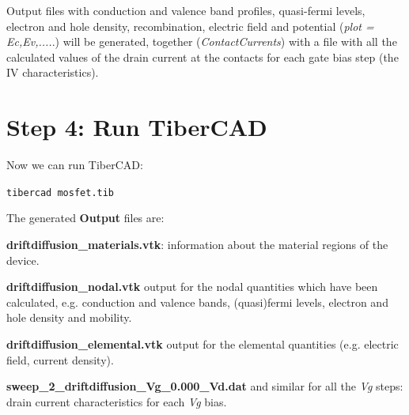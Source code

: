 Output files with conduction and valence band profiles, quasi-fermi levels, electron and hole  density, recombination, electric field and potential (\textit{plot = Ec,Ev,....}.) will be  generated, together (\textit{ContactCurrents}) with  a file with  all the calculated values of the drain current at the contacts for each  gate bias  step  (the IV characteristics).

\section*{Step 4: Run TiberCAD{}}

Now we can run TiberCAD{}:

\texttt{tibercad  mosfet.tib}


\vspace{0.5cm}
The generated \textbf{Output} files are:

\textbf{driftdiffusion\_materials.vtk}:  information about the material regions of the device.

\textbf{driftdiffusion\_nodal.vtk}   output for the nodal quantities which have been calculated, e.g. conduction and valence bands, (quasi)fermi levels, electron and hole density and mobility.

\textbf{driftdiffusion\_elemental.vtk}  output for the elemental  quantities (e.g. electric field, current density).


\textbf{sweep\_2\_driftdiffusion\_Vg\_0.000\_Vd.dat}  and  similar for  all the  \textit{Vg}  steps: drain current characteristics for each \textit{Vg} bias.






